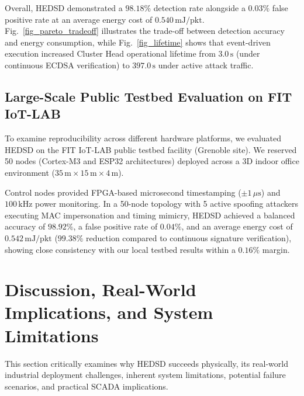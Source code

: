 \documentclass[conference]{IEEEtran}
\begin{document}
Overall, HEDSD demonstrated a $98.18\%$ detection rate alongside a $0.03\%$ false positive rate at an average energy cost of $0.540\,\text{mJ/pkt}$. Fig.~\ref{fig_pareto_tradeoff} illustrates the trade-off between detection accuracy and energy consumption, while Fig.~\ref{fig_lifetime} shows that event-driven execution increased Cluster Head operational lifetime from $3.0\,\text{s}$ (under continuous ECDSA verification) to $397.0\,\text{s}$ under active attack traffic.

\subsection{Large-Scale Public Testbed Evaluation on FIT IoT-LAB}
\label{subsec:fit_iot_lab}
To examine reproducibility across different hardware platforms, we evaluated HEDSD on the FIT IoT-LAB public testbed facility (Grenoble site). We reserved 50 nodes (Cortex-M3 and ESP32 architectures) deployed across a 3D indoor office environment ($35\,\text{m} \times 15\,\text{m} \times 4\,\text{m}$).

Control nodes provided FPGA-based microsecond timestamping ($\pm 1\,\mu\text{s}$) and $100\,\text{kHz}$ power monitoring. In a 50-node topology with 5 active spoofing attackers executing MAC impersonation and timing mimicry, HEDSD achieved a balanced accuracy of $98.92\%$, a false positive rate of $0.04\%$, and an average energy cost of $0.542\,\text{mJ/pkt}$ ($99.38\%$ reduction compared to continuous signature verification), showing close consistency with our local testbed results within a $0.16\%$ margin.

\section{Discussion, Real-World Implications, and System Limitations}
\label{sec_discussion}

This section critically examines why HEDSD succeeds physically, its real-world industrial deployment challenges, inherent system limitations, potential failure scenarios, and practical SCADA implications.
\end{document}

